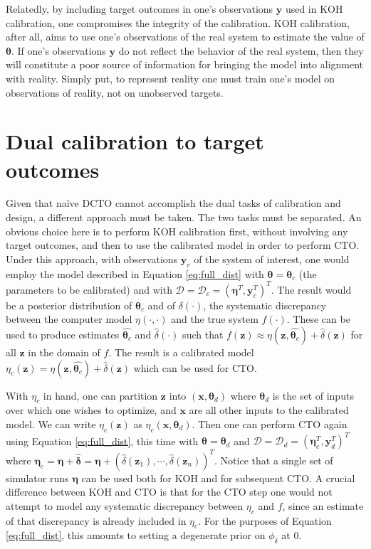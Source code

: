 \documentclass[12pt]{article}
\begin{document}
%
Relatedly, by including target outcomes in one's observations $\mathbf y$ used in KOH calibration, one compromises the integrity of the calibration.
%
KOH calibration, after all, aims to use one's observations of the real system to estimate the value of  $\boldsymbol \theta$.
%
If one's observations $\mathbf y$ do not reflect the behavior of the real system, then they will constitute a poor source of information for bringing the model into alignment with reality.
%
Simply put, to represent reality one must train one's model on observations of reality, not on unobserved targets.
%

%
\section{Dual calibration to target outcomes}
%
Given that na\"ive DCTO cannot accomplish the dual tasks of calibration and design, a different approach must be taken.
%
The two tasks must be separated.
%
An obvious choice here is to perform KOH calibration first, without involving any target outcomes, and then to use the calibrated model in order to perform CTO.
%
Under this approach, with observations $
\mathbf y_r$ of the system of interest, one would employ the model described in Equation \eqref{eq:full_dist} with $\boldsymbol \theta = \boldsymbol \theta_c$ (the parameters to be calibrated) and with $\mathcal D = \mathcal D_c = (\boldsymbol\eta^T, \mathbf y_c^T)^T$.
%
The result would be a posterior distribution of $\boldsymbol \theta_c$ and of $\delta(\cdot)$, the systematic discrepancy between the computer model $\eta(\cdot,\cdot)$ and the true system $f(\cdot)$.
%
These can be used to produce estimates $\widehat{\boldsymbol\theta_c}$ and $\widehat\delta(\cdot)$ such that $f(\mathbf z)\approx\eta(\mathbf z,\widehat{\boldsymbol\theta_c})+\widehat\delta(\mathbf z)$ for all $\mathbf z$ in the domain of $f$.
%
The result is a calibrated model $\eta_c(\mathbf z)=\eta(\mathbf z,\widehat{\boldsymbol\theta_c})+\widehat\delta(\mathbf z)$ which can be used for CTO.
%

%
With $\eta_c$ in hand, one can partition $\mathbf z$ into $(\mathbf x,\boldsymbol\theta_d)$ where $\boldsymbol\theta_d$ is the set of inputs over which one wishes to optimize, and $\mathbf x$ are all other inputs to the calibrated model.
%
We can write $\eta_c(\mathbf z)$ as $\eta_c(\mathbf x,\boldsymbol\theta_d)$.
%
Then one can perform CTO again using Equation \eqref{eq:full_dist}, this time with $\boldsymbol\theta = \boldsymbol\theta_d$ and $\mathcal D = \mathcal D_d = (\boldsymbol\eta_c^T,\mathbf y_d^T)^T$ where $\boldsymbol\eta_c = \boldsymbol \eta+ \widehat{\boldsymbol \delta}= \boldsymbol \eta+ (\widehat\delta(\mathbf z_1), \cdots, \widehat\delta(\mathbf z_n))^T.$
%
Notice that a single set of simulator runs $\boldsymbol\eta$ can be used both for KOH and for subsequent CTO.
%
A crucial difference between KOH and CTO is that for the CTO step one would not attempt to model any systematic discrepancy between $\eta_c$ and $f$, since an estimate of that discrepancy is already included in $\eta_c$.
%
For the purposes of Equation \eqref{eq:full_dist}, this amounts to setting a degenerate prior on $\phi_\delta$ at 0.
%
\end{document}
